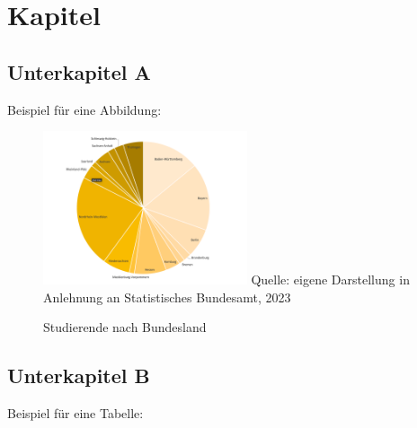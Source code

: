 \documentclass[11pt,twoside]{article}
\begin{document}
\section{Kapitel}\label{sec:kapitel}
\blindtext

\subsection{Unterkapitel A}\label{subsec:unterkapitel-a}
Beispiel für eine Abbildung: \\
\begin{figure}[H]
	\caption{Studierende nach Bundesland}
	\label{fig:studis}
	\includegraphics[width=6cm]{studierende_nach_bundesland}
	\footnotesize
	Quelle: eigene Darstellung in Anlehnung an Statistisches Bundesamt, 2023
\end{figure}

\subsection{Unterkapitel B}\label{subsec:unterkapitel-b}

Beispiel für eine Tabelle: \\
\end{document}
